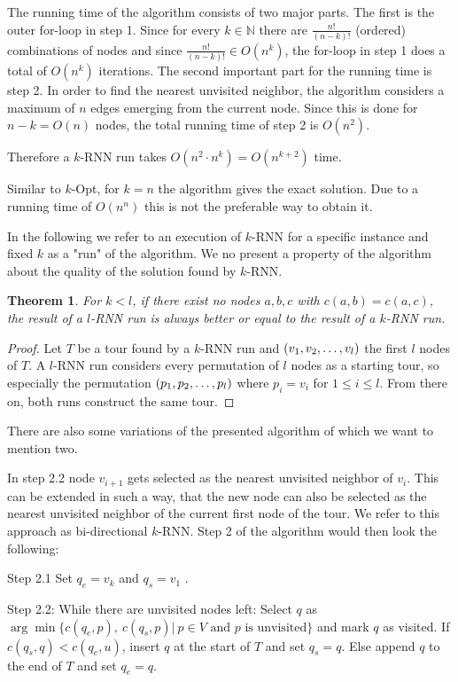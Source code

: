 \documentclass[11pt]{article}
\newtheorem{theorem}{Theorem}
\begin{document}
	The running time of the algorithm consists of two major parts. 
	The first is the outer for-loop in step 1. 
	Since for every $k \in \mathbb{N}$ there are $\frac{n!}{(n-k)!}$ (ordered) combinations of nodes and since $\frac{n!}{(n-k)!} \in O(n^k)$, the for-loop in step 1 does a total of $O(n^k)$ iterations.
	The second important part for the running time is step 2. In order to find the nearest unvisited neighbor, the algorithm considers a maximum of $n$ edges emerging from the current node. 
	Since this is done for $n - k = O(n)$ nodes, the total running time of step 2 is $O(n^2)$.
	
	Therefore a $k$-RNN run takes $O(n^2 \cdot n^k) = O(n^{k+2})$ time.
	
	Similar to $k$-Opt, for $k = n$ the algorithm gives the exact solution. 
	Due to a running time of $O(n^n)$ this is not the preferable way to obtain it.
	
	In the following we refer to an execution of $k$-RNN for a specific instance and fixed $k$ as a "run" of the algorithm.
	We no present a property of the algorithm about the quality of the solution found by $k$-RNN.
	\begin{theorem}
		For $k < l$, if there exist no nodes $a, b, c$ with $c(a, b) = c(a, c)$, the result of a $l$-RNN run is always better or equal to the result of a $k$-RNN run.
	\end{theorem}
	\begin{proof}
		Let $T$ be a tour found by a $k$-RNN run and $(v_1, v_2, \mathellipsis, v_l)$ the first $l$ nodes of $T$. 
		A $l$-RNN run considers every permutation of $l$ nodes as a starting tour, so especially the permutation $(p_1, p_2, \mathellipsis, p_l)$ where $p_i = v_i$ for $1 \leq i \leq l$. 
		From there on, both runs construct the same tour.
	\end{proof}
	
	There are also some variations of the presented algorithm of which we want to mention two.
	
	In step 2.2 node $v_{i+1}$ gets selected as the nearest unvisited neighbor of $v_i$. This can be extended in such a way, that the new node can also be selected as the nearest unvisited neighbor of the current first node of the tour. 
	We refer to this approach as bi-directional $k$-RNN. Step 2 of the algorithm would then look the following:
	
	Step 2.1 Set $q_e = v_k$ and $q_s = v_1$ .
	
	Step 2.2: While there are unvisited nodes left: 
	Select $q$ as $\arg \min\{c(q_e, p),\ c(q_s, p) |\ p \in V \text{ and $p$ is unvisited}\}$ and mark $q$ as visited. If $c(q_s, q) < c (q_e, u)$, insert $q$ at the start of $T$ and set $q_s = q$. Else append $q$ to the end of $T$ and set $q_e = q$.
	
\end{document}
